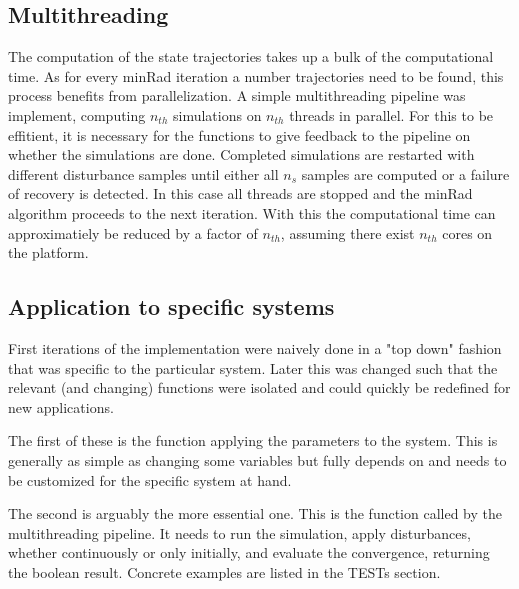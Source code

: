    


    


\subsection{Multithreading}

    The computation of the state trajectories takes up a bulk of the computational time. As for every minRad iteration a number trajectories need to be found, this process benefits from parallelization. A simple multithreading pipeline was implement, computing $n_{th}$ simulations on $n_{th}$ threads in parallel. For this to be effitient, it is necessary for the functions to give feedback to the pipeline on whether the simulations are done. Completed simulations are restarted with different disturbance samples until either all $n_s$ samples are computed or a failure of recovery  is detected. In this case all threads are stopped and the minRad algorithm proceeds to the next iteration. 
    With this the computational time can approximatiely be reduced by a factor of $n_{th}$, assuming there exist $n_{th}$ cores on the platform. 


\subsection{Application to specific systems}
    
    First iterations of the implementation were naively done in a "top down" fashion that was specific to the particular system. Later this was changed such that the relevant (and changing) functions were isolated and could quickly be redefined for new applications. 

    The first of these is the function applying the parameters to the system. This is generally as simple as changing some variables but fully depends on and needs to be customized for the specific system at hand.  

    The second is arguably the more essential one. This is the function called by the multithreading pipeline. It needs to run the simulation, apply disturbances, whether continuously or only initially, and evaluate the convergence, returning the boolean result. Concrete examples are listed in the TESTs section. 


